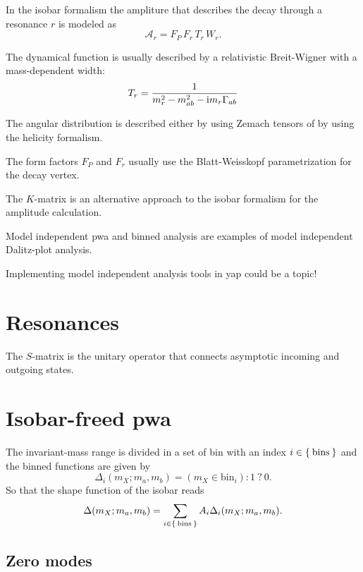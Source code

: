 \documentclass[
	10pt,
	twoside,
	openright,
]{scrbook}
\newcommand{\A}{\ensuremath{\mathcal{A}}}
\begin{document}
In the isobar formalism the ampliture that describes the decay through a resonance $r$ is modeled as
\begin{equation}
    \A_r = F_P\,F_r\, T_r\, W_r.
\end{equation}

The dynamical function is usually described by a relativistic Breit-Wigner with a mass-dependent width:
\begin{equation}
    T_r = \frac{1}{m_r^2 - m_{ab}^2 - \mathrm{i} m_r \Gamma_{ab}}
\end{equation}

The angular distribution is described either by using Zemach tensors of by using the helicity formalism.


The form factors $F_P$ and $F_r$ usually use the Blatt-Weisskopf parametrization for the decay vertex.


The $K$-matrix is an alternative approach to the isobar formalism for the amplitude calculation.


Model independent \gls{pwa} and binned analysis are examples of model independent Dalitz-plot analysis.



Implementing model independent analysis tools in \gls{yap} could be a topic!

\section{Resonances}

The $S$-matrix is the unitary operator that connects asymptotic incoming and outgoing states.


\section{Isobar-freed \gls{pwa}}

The invariant-mass range is divided in a set of bin with an index $i \in \Set{ \text{bins} }$ and the binned functions are given by
\begin{equation}
    \Delta_i(m_X; m_a, m_b) = ( m_X \in \text{bin}_i) : 1\  ?\  0.
\end{equation}
So that the shape function of the isobar reads
\begin{equation}
    \Delta(m_X; m_a, m_b) = \sum_{i\in \Set{\text{bins}}} A_i \Delta_i(m_X;m_a, m_b).
\end{equation}

    \subsection{Zero modes}
\end{document}
